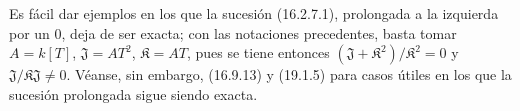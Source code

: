 Es fácil dar ejemplos en los que la sucesión (16.2.7.1), prolongada a la izquierda
por un 0, deja de ser exacta; con las notaciones precedentes, basta
tomar $A=k[T]$, $\mathfrak J=AT^2$, $\mathfrak{K}=AT$, pues se tiene entonces
$(\mathfrak J+\mathfrak{K}^2)/\mathfrak{K}^2=0$ y
$\mathfrak J/\mathfrak{K}\mathfrak J\neq 0$. Véanse, sin embargo, (16.9.13) y
(19.1.5) para casos útiles en los que la sucesión prolongada sigue siendo exacta.

